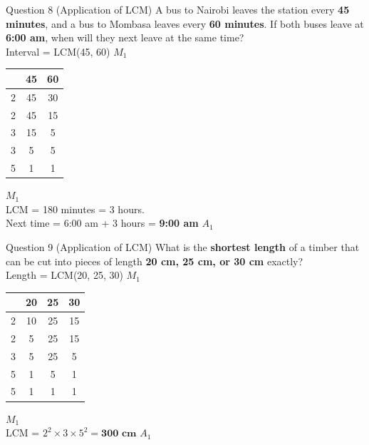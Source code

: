 \documentclass[12pt, a4paper, oneside]{article}
\begin{document}
\begin{solvingbox}{Question 8 (Application of LCM)}
A bus to Nairobi leaves the station every \textbf{45 minutes}, and a bus to Mombasa leaves every \textbf{60 minutes}. If both buses leave at \textbf{6:00 am}, when will they next leave at the same time? \\
Interval = LCM(45, 60) \hfill $M_1$ \\
\begin{tabular}{|c|c|c|} \hline
    & \textbf{45} & \textbf{60} \\ \hline
    2 & 45 & 30 \\ \hline
    2 & 45 & 15 \\ \hline
    3 & 15 & 5 \\ \hline
    3 & 5 & 5 \\ \hline
    5 & 1 & 1 \\ \hline
\end{tabular} \hfill $M_1$ \\
LCM = 180 minutes = 3 hours. \\
Next time = 6:00 am + 3 hours = \textbf{9:00 am} \hfill $A_1$
\end{solvingbox}

\begin{solvingbox}{Question 9 (Application of LCM)}
What is the \textbf{shortest length} of a timber that can be cut into pieces of length \textbf{20 cm, 25 cm, or 30 cm} exactly? \\
Length = LCM(20, 25, 30) \hfill $M_1$ \\
\begin{tabular}{|c|c|c|c|} \hline
    & \textbf{20} & \textbf{25} & \textbf{30} \\ \hline
    2 & 10 & 25 & 15 \\ \hline
    2 & 5 & 25 & 15 \\ \hline
    3 & 5 & 25 & 5 \\ \hline
    5 & 1 & 5 & 1 \\ \hline
    5 & 1 & 1 & 1 \\ \hline
\end{tabular} \hfill $M_1$ \\
LCM = $2^2 \times 3 \times 5^2 = \mathbf{300\text{ cm}}$ \hfill $A_1$
\end{solvingbox}
\end{document}
